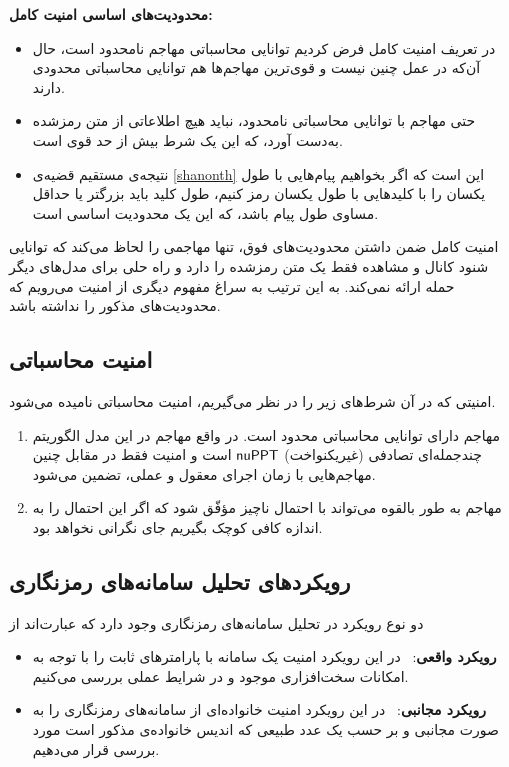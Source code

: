\textbf{محدودیت‌های اساسی امنیت کامل:}
\begin{itemize}
	\item
	 در تعریف امنیت کامل فرض کردیم توانایی محاسباتی مهاجم نامحدود است، حال آن‌که در عمل چنین نیست و قوی‌ترین مهاجم‌ها هم توانایی محاسباتی محدودی دارند. 
	\item
	حتی مهاجم با توانایی محاسباتی نامحدود، نباید هیچ اطلاعاتی از متن رمز‌شده  به‌دست  آورد، که این یک شرط بیش‌ از حد قوی است. 
	 
	\item
	 نتیجه‌ی مستقیم قضیه‌ی
	 \ref{shanonth}
	 این است که اگر بخواهیم پیام‌هایی با طول یکسان را با کلید‌هایی با طول یکسان رمز کنیم، طول کلید‌ باید بزرگتر یا حداقل مساوی  طول پیام باشد، که این یک محدودیت اساسی است.
\end{itemize}
امنیت کامل ضمن داشتن محدودیت‌های فوق، تنها مهاجمی را لحاظ می‌کند که توانایی شنود کانال و مشاهده فقط یک متن رمزشده را دارد و راه حلی برای مدل‌های دیگر حمله ارائه نمی‌کند. به این ترتیب به سراغ مفهوم دیگری از امنیت می‌رویم که محدودیت‌های مذکور را نداشته باشد.
\subsection*{امنیت محاسباتی}
امنیتی که در آن شرط‌های زیر را در نظر می‌گیریم، امنیت محاسباتی نامیده‌ می‌شود.
\begin{enumerate}
\item
مهاجم دارای توانایی محاسباتی محدود است. در واقع مهاجم‌ در این مدل الگوریتم‌ چندجمله‌ای تصادفی (غیریکنواخت) 
$\mathsf{nuPPT}$
است و امنیت فقط در مقابل چنین مهاجم‌هایی با زمان اجرای معقول و عملی، تضمین می‌شود.
\item
مهاجم به طور بالقوه می‌تواند با احتمال ناچیز مؤفّق شود که اگر این احتمال را به اندازه کافی کوچک  بگیریم جای نگرانی نخواهد بود.
\end{enumerate}

\subsection*{رویکردهای تحلیل سامانه‌های رمزنگاری }
دو نوع رویکرد در تحلیل سامانه‌های رمزنگاری وجود دارد که عبارت‌اند از
\begin{itemize}
\item
\textbf{رویکرد واقعی}: \ 
 در این رویکرد امنیت یک سامانه با پارامترهای ثابت را با توجه  به امکانات سخت‌افزاری موجود و در شرایط عملی بررسی می‌کنیم.
\item
\textbf{رویکرد مجانبی}: \ 
در این رویکرد امنیت خانواده‌ای از سامانه‌های رمزنگاری را به صورت مجانبی و بر حسب یک عدد طبیعی که اندیس خانواده‌ی مذکور است مورد بررسی قرار می‌دهیم.
\end{itemize}

